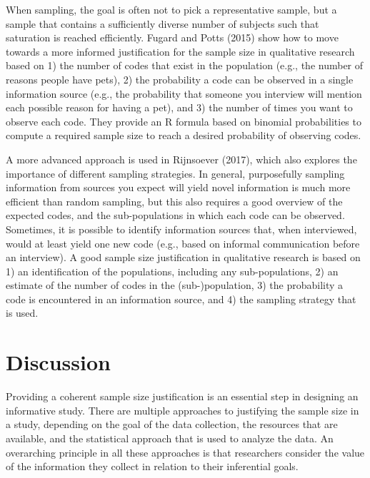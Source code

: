 \documentclass[
  english,
  ,jou,floatsintext]{apa6}
\begin{document}
When sampling, the goal is often not to pick a representative sample, but a sample that contains a sufficiently diverse number of subjects such that saturation is reached efficiently. Fugard and Potts (2015) show how to move towards a more informed justification for the sample size in qualitative research based on 1) the number of codes that exist in the population (e.g., the number of reasons people have pets), 2) the probability a code can be observed in a single information source (e.g., the probability that someone you interview will mention each possible reason for having a pet), and 3) the number of times you want to observe each code. They provide an R formula based on binomial probabilities to compute a required sample size to reach a desired probability of observing codes.

A more advanced approach is used in Rijnsoever (2017), which also explores the importance of different sampling strategies. In general, purposefully sampling information from sources you expect will yield novel information is much more efficient than random sampling, but this also requires a good overview of the expected codes, and the sub-populations in which each code can be observed. Sometimes, it is possible to identify information sources that, when interviewed, would at least yield one new code (e.g., based on informal communication before an interview). A good sample size justification in qualitative research is based on 1) an identification of the populations, including any sub-populations, 2) an estimate of the number of codes in the (sub-)population, 3) the probability a code is encountered in an information source, and 4) the sampling strategy that is used.

\hypertarget{discussion}{%
\section{Discussion}\label{discussion}}

Providing a coherent sample size justification is an essential step in designing an informative study. There are multiple approaches to justifying the sample size in a study, depending on the goal of the data collection, the resources that are available, and the statistical approach that is used to analyze the data. An overarching principle in all these approaches is that researchers consider the value of the information they collect in relation to their inferential goals.
\end{document}
